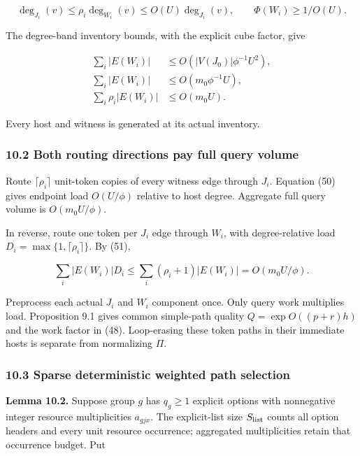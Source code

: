 \[
\deg_{J_i}(v)\leq\rho_i\deg_{W_i}(v)
                 \leq O(U)\deg_{J_i}(v),
 \qquad \Phi(W_i)\geq1/O(U).
 \tag{50}
\]

The degree-band inventory bounds, with the explicit cube factor, give

\[
\begin{aligned}
 \sum_i|E(W_i)|&\leq O(|V(J_0)|\phi^{-1}U^2),\\
 \sum_i|E(W_i)|&\leq O(m_0\phi^{-1}U),\\
 \sum_i\rho_i|E(W_i)|&\leq O(m_0U).
\end{aligned}
 \tag{51}
\]

Every host and witness is generated at its actual inventory.

\hypertarget{af-46593eb93e-both-routing-directions-pay-full-query-volume}{%
\subsubsection{10.2 Both routing directions pay full query volume}\label{af-46593eb93e-both-routing-directions-pay-full-query-volume}}

Route \(\lceil\rho_i\rceil\) unit-token copies of every witness edge through \(J_i\). Equation (50) gives endpoint load \(O(U/\phi)\) relative to host degree. Aggregate full query volume is \(O(m_0U/\phi)\).

In reverse, route one token per \(J_i\) edge through \(W_i\), with degree-relative load \(D_i=\max\{1,\lceil\rho_i\rceil\}\). By (51),

\[
\sum_i|E(W_i)|D_i
 \leq\sum_i(\rho_i+1)|E(W_i)|
 =O(m_0U/\phi).
 \tag{52}
\]

Preprocess each actual \(J_i\) and \(W_i\) component once. Only query work multiplies load. Proposition 9.1 gives common simple-path quality \(Q=\exp O((p+r)h)\) and the work factor in (48). Loop-erasing these token paths in their immediate hosts is separate from normalizing \(\Pi\).

\hypertarget{af-46593eb93e-sparse-deterministic-weighted-path-selection}{%
\subsubsection{10.3 Sparse deterministic weighted path selection}\label{af-46593eb93e-sparse-deterministic-weighted-path-selection}}

\textbf{Lemma 10.2.} Suppose group \(g\) has \(q_g\geq1\) explicit options with nonnegative integer resource multiplicities \(a_{gjx}\). The explicit-list size \(S_{\rm list}\) counts all option headers and every unit resource occurrence; aggregated multiplicities retain that occurrence budget. Put

